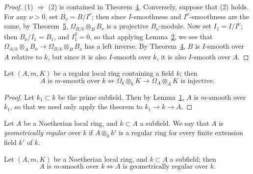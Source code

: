 \begin{proof}
(1) $\Rightarrow$ (2) is contained in Theorem~\hyperref[thm:28.4]{4}. Conversely, suppose that (2)
holds. For any $\nu > 0$, set $B_\nu = B/I^\nu$; then since $I$-smoothness and
$I^\nu$-smoothness are the same, by Theorem~\hyperref[thm:28.5]{5}, $\Omega_{B/k} \otimes_B B_\nu$ is a
projective $B_\nu$-module. Now set $I_1 = I/I^\nu$; then $B_\nu/I_1 = B_1$, and
$I_1^2 = 0$, so that applying Lemma~\hyperref[lem:28.2]{2}, we see that
$\Omega_{A/k} \otimes_A B_\nu \to \Omega_{B/k} \otimes_B B_\nu$ has a left inverse. By
Theorem~\hyperref[thm:28.4]{4}, $B$ is $I$-smooth over $A$ relative to $k$, but since it is also
$I$-smooth over $k$, it is also $I$-smooth over $A$.
\end{proof}

\begin{corollary*}
Let $(A, m, K)$ be a regular local ring containing a field $k$; then
\[
  A \text{ is } m\text{-smooth over } k \iff \Omega_k \otimes_k K \to \Omega_A \otimes_A K \text{ is injective}.
\]
\end{corollary*}

\begin{proof}
Let $k_1 \subset k$ be the prime subfield. Then by Lemma~\hyperref[lem:28.1]{1}, $A$ is $m$-smooth
over $k_1$, so that we need only apply the theorem to $k_1 \to k \to A$.
\end{proof}

Let $A$ be a Noetherian local ring, and $k \subset A$ a subfield. We say that $A$ is
\emph{geometrically regular} over $k$ if $A \otimes_k k'$ is a regular ring for every finite
extension field $k'$ of $k$.

\begin{theorem}\label{thm:28.7}
Let $(A, m, K)$ be a Noetherian local ring, and $k \subset A$ a subfield; then
\[
  A \text{ is } m\text{-smooth over } k \iff A \text{ is geometrically regular over } k.
\]
\end{theorem}

